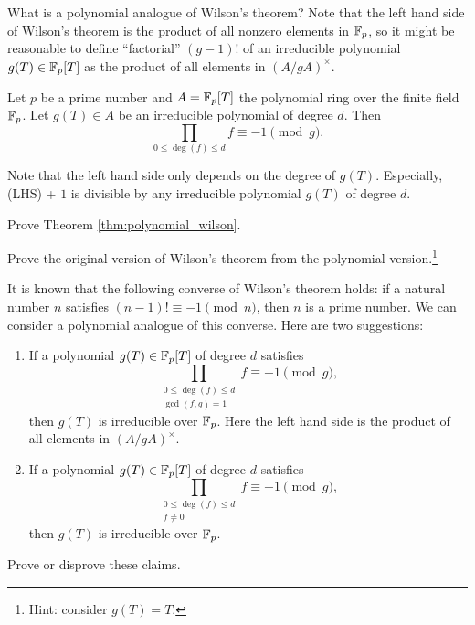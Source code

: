 What is a polynomial analogue of Wilson's theorem?
Note that the left hand side of Wilson's theorem is the product of all nonzero elements in $\mathbb{F}_p$, so it might be reasonable to define ``factorial'' $(g - 1)!$ of an irreducible polynomial $g(T) \in \mathbb{F}_p[T]$ as the product of all elements in $(A / gA)^\times$.

\begin{theorem}
    \label{thm:polynomial_wilson}
    Let $p$ be a prime number and $A = \mathbb{F}_p[T]$ the polynomial ring over the finite field $\mathbb{F}_p$.
    Let $g(T) \in A$ be an irreducible polynomial of degree $d$.
    Then
    \[
        \prod_{0 \le \deg(f) \le d} f \equiv -1 \pmod{g}.
    \]
\end{theorem}

Note that the left hand side only depends on the degree of $g(T)$.
Especially, (LHS) + $1$ is divisible by any irreducible polynomial $g(T)$ of degree $d$.

\begin{exercise}
    Prove Theorem \ref{thm:polynomial_wilson}.
\end{exercise}

\begin{exercise}
    Prove the original version of Wilson's theorem from the polynomial version.\footnote{Hint: consider $g(T) = T$.} 
\end{exercise}

\begin{exercise}
    It is known that the following converse of Wilson's theorem holds: if a natural number $n$ satisfies $(n - 1)! \equiv -1 \pmod{n}$, then $n$ is a prime number.
    We can consider a polynomial analogue of this converse.
    Here are two suggestions:
    \begin{enumerate}
        \item If a polynomial $g(T) \in \mathbb{F}_p[T]$ of degree $d$ satisfies
        \[
            \prod_{\substack{0 \le \deg(f) \le d \\ \gcd(f, g) = 1}} f \equiv -1 \pmod{g},
        \]
        then $g(T)$ is irreducible over $\mathbb{F}_p$. Here the left hand side is the product of all elements in $(A / gA)^\times$.
        \item If a polynomial $g(T) \in \mathbb{F}_p[T]$ of degree $d$ satisfies
        \[
            \prod_{\substack{0 \le \deg(f) \le d \\ f \ne 0}} f \equiv -1 \pmod{g},
        \]
        then $g(T)$ is irreducible over $\mathbb{F}_p$.
    \end{enumerate}
    Prove or disprove these claims.
\end{exercise}

\newpage
